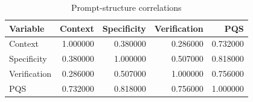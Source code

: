 \begin{table}
\caption{Prompt-structure correlations}
\label{tab:appendix-b-correlations}
\begin{tabular}{lrrrr}
\toprule
Variable & Context & Specificity & Verification & PQS \\
\midrule
Context & 1.000000 & 0.380000 & 0.286000 & 0.732000 \\
Specificity & 0.380000 & 1.000000 & 0.507000 & 0.818000 \\
Verification & 0.286000 & 0.507000 & 1.000000 & 0.756000 \\
PQS & 0.732000 & 0.818000 & 0.756000 & 1.000000 \\
\bottomrule
\end{tabular}
\end{table}
